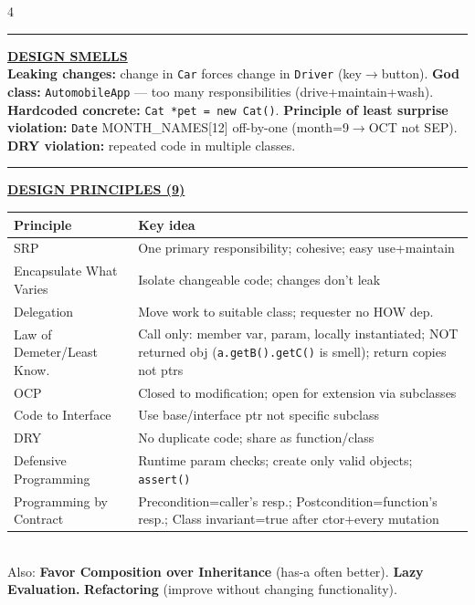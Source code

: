 \documentclass[landscape,letterpaper]{article}
\newcommand{\h}[1]{\textbf{#1}}
\newcommand{\hd}[1]{\vspace{1pt}\noindent\textbf{\underline{#1}}\vspace{-1pt}}
\begin{document}
\begin{multicols}{4}
\vspace{-1pt}\noindent\rule{\columnwidth}{0.2pt}\vspace{-3pt}

\hd{DESIGN SMELLS}\\[-2pt]
\h{Leaking changes:} change in \texttt{Car} forces change in \texttt{Driver} (key$\to$button). \h{God class:} \texttt{AutomobileApp} — too many responsibilities (drive+maintain+wash). \h{Hardcoded concrete:} \texttt{Cat *pet = new Cat()}. \h{Principle of least surprise violation:} \texttt{Date} MONTH\_NAMES[12] off-by-one (month=9$\to$OCT not SEP). \h{DRY violation:} repeated code in multiple classes.\\[-2pt]

\vspace{-1pt}\noindent\rule{\columnwidth}{0.2pt}\vspace{-3pt}

\hd{DESIGN PRINCIPLES (9)}\\[-2pt]
\vspace{-3pt}
{\fontsize{5.8}{6.6}\selectfont
\begin{tabular}{@{}p{1.4in}p{1.2in}@{}}
\toprule
\textbf{Principle} & \textbf{Key idea}\\
\midrule
SRP & One primary responsibility; cohesive; easy use+maintain\\
Encapsulate What Varies & Isolate changeable code; changes don't leak\\
Delegation & Move work to suitable class; requester no HOW dep.\\
Law of Demeter/Least Know. & Call only: member var, param, locally instantiated; NOT returned obj (\texttt{a.getB().getC()} is smell); return copies not ptrs\\
OCP & Closed to modification; open for extension via subclasses\\
Code to Interface & Use base/interface ptr not specific subclass\\
DRY & No duplicate code; share as function/class\\
Defensive Programming & Runtime param checks; create only valid objects; \texttt{assert()}\\
Programming by Contract & Precondition=caller's resp.; Postcondition=function's resp.; Class invariant=true after ctor+every mutation\\
\bottomrule
\end{tabular}
}\\[-2pt]
Also: \h{Favor Composition over Inheritance} (has-a often better). \h{Lazy Evaluation.} \h{Refactoring} (improve without changing functionality).\\[-2pt]


\end{multicols}
\end{document}
